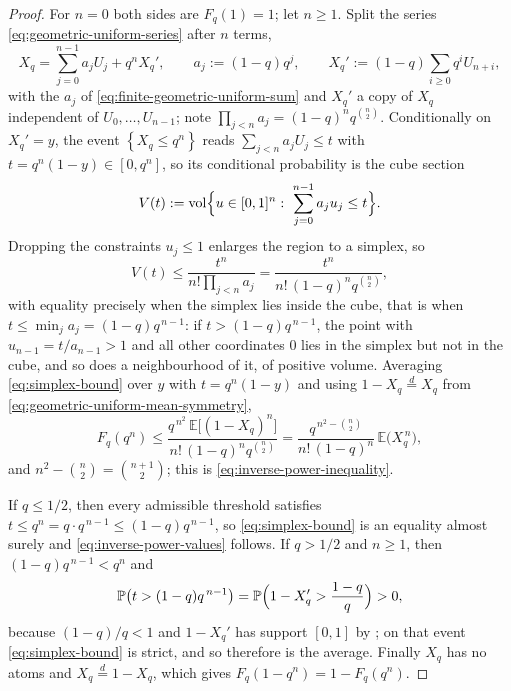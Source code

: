 \documentclass[11pt,oneside,openany]{book}
\theoremstyle{definition}
\theoremstyle{remark}
\newcommand{\set}[1]{\left\{#1\right\}}
\newcommand{\defeq}{\mathrel{:=}}
\begin{document}
\begin{proof}
For $n=0$ both sides are $F_q(1)=1$; let $n\ge1$.  Split the series
\eqref{eq:geometric-uniform-series} after $n$ terms,
\begin{equation}\label{eq:inverse-power-split}
 X_q=\sum_{j=0}^{n-1}a_jU_j+q^nX_q',
 \qquad a_j\defeq(1-q)q^j,
 \qquad X_q'\defeq(1-q)\sum_{i\ge0}q^iU_{n+i},
\end{equation}
with the $a_j$ of \eqref{eq:finite-geometric-uniform-sum} and $X_q'$ a copy of $X_q$
independent of $U_0,\ldots,U_{n-1}$; note $\prod_{j<n}a_j=(1-q)^nq^{\binom n2}$.
Conditionally on $X_q'=y$, the event $\set{X_q\le q^n}$ reads $\sum_{j<n}a_jU_j\le t$
with $t=q^n(1-y)\in[0,q^n]$, so its conditional probability is the cube section
\[
 V(t)\defeq\operatorname{vol}
 \Bigl\{u\in[0,1]^n:\ \sum_{j=0}^{n-1}a_ju_j\le t\Bigr\}.
\]
Dropping the constraints $u_j\le1$ enlarges the region to a simplex, so
\begin{equation}\label{eq:simplex-bound}
 V(t)\le\frac{t^n}{n!\prod_{j<n}a_j}
      =\frac{t^n}{n!\,(1-q)^nq^{\binom n2}},
\end{equation}
with equality precisely when the simplex lies inside the cube, that is when
$t\le\min_ja_j=(1-q)q^{\,n-1}$: if $t>(1-q)q^{\,n-1}$, the point with
$u_{n-1}=t/a_{n-1}>1$ and all other coordinates $0$ lies in the simplex but not in the
cube, and so does a neighbourhood of it, of positive volume.  Averaging
\eqref{eq:simplex-bound} over $y$ with $t=q^n(1-y)$ and using
$1-X_q\overset d=X_q$ from \eqref{eq:geometric-uniform-mean-symmetry},
\[
 F_q(q^n)\le\frac{q^{\,n^2}\,\mathbb E\bigl[(1-X_q)^n\bigr]}
                 {n!\,(1-q)^nq^{\binom n2}}
 =\frac{q^{\,n^2-\binom n2}}{n!\,(1-q)^n}\,\mathbb E\bigl(X_q^{\,n}\bigr),
\]
and $n^2-\binom n2=\binom{n+1}{2}$; this is \eqref{eq:inverse-power-inequality}.

If $q\le1/2$, then every admissible threshold satisfies
$t\le q^n=q\cdot q^{\,n-1}\le(1-q)q^{\,n-1}$, so \eqref{eq:simplex-bound} is an equality
almost surely and \eqref{eq:inverse-power-values} follows.  If $q>1/2$ and $n\ge1$, then
$(1-q)q^{\,n-1}<q^n$ and
\[
 \mathbb P\bigl(t>(1-q)q^{\,n-1}\bigr)
 =\mathbb P\Bigl(1-X_q'>\frac{1-q}q\Bigr)>0,
\]
because $(1-q)/q<1$ and $1-X_q'$ has support $[0,1]$ by
; on that event \eqref{eq:simplex-bound} is strict, and
so therefore is the average.  Finally $X_q$ has no atoms and $X_q\overset d=1-X_q$, which
gives $F_q(1-q^n)=1-F_q(q^n)$.
\end{proof}
\end{document}
